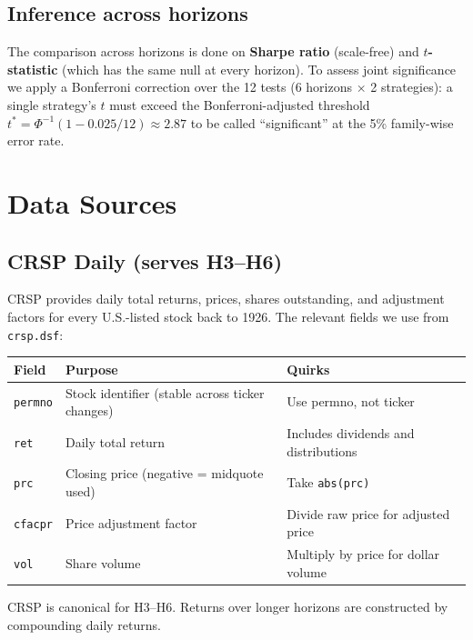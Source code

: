\documentclass[11pt,letterpaper]{article}
\begin{document}
\subsection{Inference across horizons}

The comparison across horizons is done on \textbf{Sharpe ratio} (scale-free) and \textbf{$t$-statistic} (which has the same null at every horizon). To assess joint significance we apply a Bonferroni correction over the 12 tests (6 horizons $\times$ 2 strategies): a single strategy's $t$ must exceed the Bonferroni-adjusted threshold $t^* = \Phi^{-1}(1-0.025/12) \approx 2.87$ to be called ``significant'' at the 5\% family-wise error rate.

\section{Data Sources}\label{sec:data}

\subsection{CRSP Daily (serves H3--H6)}

CRSP provides daily total returns, prices, shares outstanding, and adjustment factors for every U.S.-listed stock back to 1926. The relevant fields we use from \texttt{crsp.dsf}:

\begin{center}\small
\begin{tabular}{@{}lll@{}}
\toprule
\textbf{Field} & \textbf{Purpose} & \textbf{Quirks}\\
\midrule
\texttt{permno} & Stock identifier (stable across ticker changes) & Use permno, not ticker\\
\texttt{ret}    & Daily total return & Includes dividends and distributions\\
\texttt{prc}    & Closing price (negative = midquote used) & Take \texttt{abs(prc)}\\
\texttt{cfacpr} & Price adjustment factor & Divide raw price for adjusted price\\
\texttt{vol}    & Share volume & Multiply by price for dollar volume\\
\bottomrule
\end{tabular}
\end{center}

CRSP is canonical for H3--H6. Returns over longer horizons are constructed by compounding daily returns.
\end{document}
